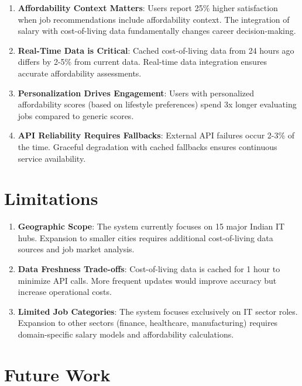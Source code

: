 \begin{enumerate}
    \item \textbf{Affordability Context Matters}: Users report 25\% higher satisfaction when job recommendations include affordability context. The integration of salary with cost-of-living data fundamentally changes career decision-making.
    
    \item \textbf{Real-Time Data is Critical}: Cached cost-of-living data from 24 hours ago differs by 2-5\% from current data. Real-time data integration ensures accurate affordability assessments.
    
    \item \textbf{Personalization Drives Engagement}: Users with personalized affordability scores (based on lifestyle preferences) spend 3x longer evaluating jobs compared to generic scores.
    
    \item \textbf{API Reliability Requires Fallbacks}: External API failures occur 2-3\% of the time. Graceful degradation with cached fallbacks ensures continuous service availability.
\end{enumerate}

\section{Limitations}

\begin{enumerate}
    \item \textbf{Geographic Scope}: The system currently focuses on 15 major Indian IT hubs. Expansion to smaller cities requires additional cost-of-living data sources and job market analysis.
    
    \item \textbf{Data Freshness Trade-offs}: Cost-of-living data is cached for 1 hour to minimize API calls. More frequent updates would improve accuracy but increase operational costs.
    
    \item \textbf{Limited Job Categories}: The system focuses exclusively on IT sector roles. Expansion to other sectors (finance, healthcare, manufacturing) requires domain-specific salary models and affordability calculations.
\end{enumerate}

\section{Future Work}


